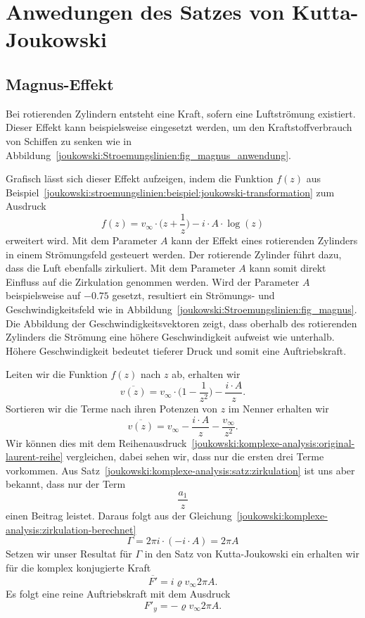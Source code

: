 \section{Anwedungen des Satzes von Kutta-Joukowski}
\label{joukowski:anwendungen}

\subsection{Magnus-Effekt}
\label{joukowski:anwendungen:magnus}


Bei rotierenden Zylindern entsteht eine Kraft, sofern eine Luftströmung existiert. Dieser Effekt kann beispielsweise eingesetzt werden, um den Kraftstoffverbrauch von Schiffen zu senken wie in Abbildung~\ref{joukowski:Stroemungslinien:fig_magnus_anwendung}.

Grafisch lässt sich dieser Effekt aufzeigen, indem die Funktion $f(z)$ aus Beispiel~\ref{joukowski:stroemungslinien:beispiel:joukowski-transformation} 
zum Ausdruck
\begin{equation}
	\label{joukowski:Stroemungslinien:equation_magnus}
	f(z) = v_\infty \cdot \biggl(z+ \frac{1}{z}\biggr) - i\cdot A\cdot \log(z)
\end{equation}
erweitert wird.
Mit dem Parameter $A$ kann der Effekt eines rotierenden Zylinders in einem Strömungsfeld gesteuert werden.
Der rotierende Zylinder führt dazu, dass die Luft ebenfalls zirkuliert.
Mit dem Parameter $A$
kann somit direkt Einfluss auf die Zirkulation genommen werden.
Wird der Parameter $A$ beispielsweise auf $-0.75$ gesetzt, resultiert ein Strömungs- und Geschwindigkeitsfeld wie in Abbildung~\ref{joukowski:Stroemungslinien:fig_magnus}.
Die Abbildung der Geschwindigkeitsvektoren zeigt,
dass oberhalb des rotierenden Zylinders die Strömung eine höhere Geschwindigkeit aufweist wie unterhalb.
Höhere Geschwindigkeit bedeutet tieferer Druck und somit eine Auftriebskraft.

Leiten wir die Funktion $f(z)$ nach $z$ ab, erhalten wir
\[
	\overline{v(z)}
	=
	v_{\infty} \cdot \biggl(1 - \frac{1}{z^2}\biggr) 
	- \frac{i \cdot A}{z}.
\]
Sortieren wir die Terme nach ihren Potenzen von $z$ im Nenner erhalten wir
\[
	\overline{v(z)}
	=
	v_{\infty} - \frac{i \cdot A}{z} - \frac{v_{\infty}}{z^2}.
\]
Wir können dies mit dem Reihenausdruck~\eqref{joukowski:komplexe-analysis:original-laurent-reihe} vergleichen,
dabei sehen wir, dass nur die ersten drei Terme vorkommen.
Aus Satz~\ref{joukowski:komplexe-analysis:satz:zirkulation} ist uns aber bekannt, dass nur der Term
\[
	\frac{a_1}{z}
\]
einen Beitrag leistet.
Daraus folgt aus der Gleichung~\eqref{joukowski:komplexe-analysis:zirkulation-berechnet}
\[
	\Gamma
	=
	2 \pi i \cdot (-i \cdot A)
	=
	2 \pi A
\]
Setzen wir unser Resultat für $\Gamma$ in den Satz von Kutta-Joukowski ein
erhalten wir für die komplex konjugierte Kraft
\[
	\overline{F'}
	=
	i \varrho v_{\infty} 2 \pi A.
\]
Es folgt eine reine Auftriebskraft mit dem Ausdruck
\[
	F'_y
	=
	-\varrho v_{\infty} 2 \pi A.
\]

